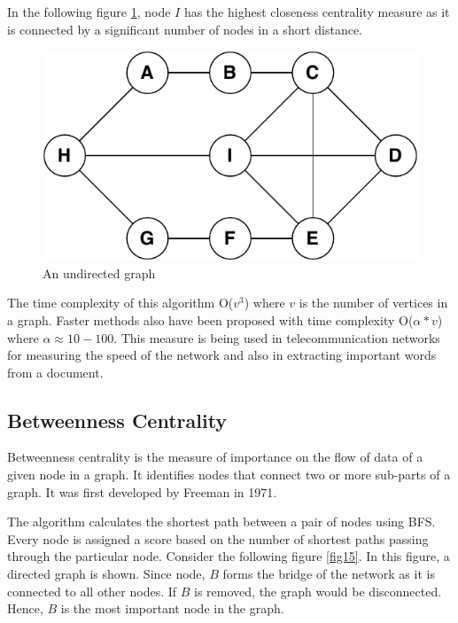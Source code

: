 \documentclass[journal,twoside,web]{ieeecolor}
\begin{document}
In the following figure \ref{fig14}, node $I$ has the highest closeness centrality measure as it is connected by a significant number of nodes in a short distance.

\begin{figure}[!h]
    \centerline{\includegraphics[scale=0.8]{figures/closeness.pdf}}
    \caption{An undirected graph}
    \label{fig14}
\end{figure}

The time complexity of this algorithm O($v^3$) where $v$ is the number of vertices in a graph. Faster methods also have been proposed with time complexity O($\alpha * v$) where $\alpha \approx 10 - 100$\cite{59}. This measure is being used in telecommunication networks for measuring the speed of the network and also in extracting important words from a document.

\subsection{Betweenness Centrality}
Betweenness centrality is the measure of importance on the flow of data of a given node in a graph. It identifies nodes that connect two or more sub-parts of a graph. It was first developed by Freeman in 1971\cite{32}.

The algorithm calculates the shortest path between a pair of nodes using BFS. Every node is assigned a score based on the number of shortest paths passing through the particular node. Consider the following figure \ref{fig15}. In this figure, a directed graph is shown. Since node, $B$ forms the bridge of the network as it is connected to all other nodes. If $B$ is removed, the graph would be disconnected. Hence, $B$ is the most important node in the graph.
\end{document}
